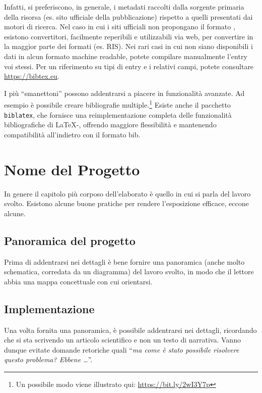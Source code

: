 \documentclass[12pt]{report}
\begin{document}
Infatti, si preferiscono, in generale, i metadati raccolti dalla sorgente primaria della risorsa (es. sito ufficiale della pubblicazione) rispetto a quelli presentati dai motori di ricerca. Nel caso in cui i siti ufficiali non propongano il formato , esistono convertitori, facilmente reperibili e utilizzabili via web, per convertire in  la maggior parte dei formati (es. RIS). Nei rari casi in cui non siano disponibili i dati in alcun formato machine readable, potete compilare manualmente l'entry  voi stessi. Per un riferimento su tipi di entry e i relativi campi, potete consultare \url{https://bibtex.eu}.

I pi\`u ``smanettoni'' possono addentrarsi a piacere in funzionalit\`a avanzate. Ad esempio \`e possibile creare bibliografie multiple.\footnote{Un possibile modo viene illustrato qui: \url{https://bit.ly/2wI3Y7p}}
Esiste anche il pacchetto \texttt{biblatex}, che fornisce una reimplementazione completa delle funzionalit\`a bibliografiche di \LaTeX-, offrendo maggiore flessibilit\`a e mantenendo compatibilit\`a all'indietro con il formato bib.





%
%

\chapter{Nome del Progetto}
\label{cap4}

In genere il capitolo più corposo dell'elaborato è quello in cui si parla del lavoro svolto. Esistono alcune buone pratiche per rendere l'esposizione efficace, eccone alcune.

\section{Panoramica del progetto}

Prima di addentrarsi nei dettagli è bene fornire una panoramica (anche molto schematica, corredata da un diagramma) del lavoro svolto, in modo che il lettore abbia una mappa concettuale con cui orientarsi.

\section{Implementazione}

Una volta fornita una panoramica, è possibile addentrarsi nei dettagli, ricordando che si sta scrivendo un articolo scientifico e non un testo di narrativa. Vanno dunque evitate domande retoriche quali ``\textit{ma come è stato possibile risolvere questo problema? Ebbene \ldots}''.
\end{document}
